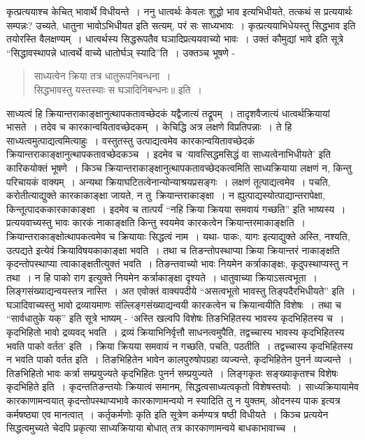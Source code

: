 {कृत्प्रत्ययाश्च केचित् भावार्थे विधीयन्ते~। ननु धात्वर्थः केवलः शुद्धो भाव इत्यभिधीयते, तत्कथं स प्रत्ययार्थः सम्पन्नः? उच्यते, धातुना भावोऽभिधीयत इति सत्यम्, परं सः साध्यभावः~। कृत्प्रत्ययाभिधेयस्तु सिद्धभाव इति तयोरस्ति वैलक्षण्यम्~। धात्वर्थस्य सिद्धरूपतैव घञादिप्रत्ययवाच्यो भावः~। उक्तं कौमुद्यां भावे इति सूत्रे “सिद्धावस्थापन्ने धात्वर्थे वाच्ये धातोर्घञ् स्यादि”ति~। उक्तञ्च भूषणे -
\begin{verse}
{साध्यत्वेन क्रिया तत्र धातुरूपनिबन्धना~। }\\
{सिद्धभावस्तु यस्तस्याः स घञादिनिबन्धनः॥} इति~। 
\end{verse}
साध्यत्वं हि क्रियान्तराकाङ्क्षानुत्थापकतावच्छेदकं यद्वैजात्यं तद्रूपम्~।     तादृशवैजात्यं धात्वर्थ\-क्रियायां भासते~। तदेव च कारकान्वयितावच्छेदकम्~। केचिद्धि अत्र लक्षणे विप्रतिपन्नाः~। ते हि साध्यत्वमुत्पाद्यत्वमित्याहुः~। वस्तुतस्तु उत्पाद्यत्वमेव कारकान्वयितावच्छेदकं क्रियान्त\-राकाङ्क्षानुत्थापकतावच्छेदकञ्च~। इदमेव च ‘यावत्सिद्धमसिद्धं वा साध्यत्वेनाभिधीयते’ इति कारिकयोक्तं भूषणे~। किञ्च क्रियान्तराकाङ्क्षानुत्थापकतावच्छेदकत्वमिति साध्यक्रियाया \-लक्षणं न, किन्तु परिचायकं वाक्यम्~। अन्यथा क्रियाघटितत्वेनान्योन्याश्रयप्रसङ्गः~। \break लक्षणं तूत्पाद्यत्वमेव~। पचति, करोतीत्याद्युक्ते कारकाकाङ्क्षा जायते, न तु\hbox{ क्रियान्तराकाङ्क्षा~।} न ह्युत्पाद्यस्योत्पाद्यान्तरापेक्षा, किन्तूत्पादककारकाकाङ्क्षा~। इदमेव च तात्पर्यं “नहि क्रिया क्रियया समवायं गच्छति” इति भाष्यस्य~। प्रत्ययवाच्यस्तु भावः कारकं नाकाङ्क्षति \hbox{किन्तु} \hbox{स्वयमेव} कारकत्वेन क्रियान्तरमाकाङ्क्षति~। क्रियान्तराकाङ्क्षोत्थापकत्वमेव च क्रियायाः \hbox{सिद्धत्वं} नाम~। यथा- पाकः, यागः इत्याद्युक्ते अस्ति, नश्यति, उत्पद्यते इत्येवं क्रियाविषय\-काकाङ्क्षा भवति~। तथा च तिङन्तोपस्थाप्या क्रिया क्रियान्तरं नाकाङ्क्षति कृदन्तोपस्थाप्या त्वाकाङ्क्षतीत्युक्तं भवति~। तिङन्तवाच्यो भावः नियमेन कर्त्राकाङ्क्षः, कृदुपस्थाप्यस्तु न तथा~। न हि पाको राग इत्युक्ते नियमेन कर्त्राकाङ्क्षा दृश्यते~। धातुवाच्या क्रियाऽसत्वभूता~। लिङ्ग\-संख्याद्यन्वयस्तत्र नास्ति~। अत एवोक्तं वाक्यपदीये “असत्वभूतो भावस्तु तिङ्पदैरभिधीयते” इति~। घञादिवाच्यस्तु भावो द्रव्यायमाणः संल्लिङ्गसंख्याद्यन्वयी कारकत्वेन च क्रियान्वयीति विशेषः~। तथा च “सार्वधातुके यक्” इति सूत्रे भाष्यम् - ‘अस्ति खल्वपि विशेषः तिङभिहितस्य भावस्य कृदभिहितस्य च~। कृदभिहितो भावो द्रव्यवद् भवति~। द्रव्यं क्रियाभिनिर्वृत्तौ साधनत्वमुपैति, तद्वच्चास्य भावस्य कृदभिहितस्य भवति पाको वर्तत’ इति~। क्रिया क्रियया समवायं न गच्छति, पचति, पठतीति~। तद्वच्चास्य कृदभिहितस्य न भवति पाको वर्तत इति~। तिङभिहितेन भावेन कालपुरुषोपग्रहा व्यज्यन्ते, कृदभिहितेन पुनर्न व्यज्यन्ते~। तिङभिहितो भावः कर्त्रा सम्प्रयुज्यते कृदभिहितः पुनर्न सम्प्रयुज्यते~। लिङ्गकृतः सङ्ख्याकृतश्च विशेषः कृदभिहिते इति~। कृदन्ततिङन्तयोः क्रियात्वं समानम्, सिद्धत्वसाध्यत्वकृतो विशेषस्तयोः~। साध्यक्रियायामेव कारकाणामन्वयात् कृदन्तोपस्थाप्यभावे कारकाणामन्वयो न स्यादिति तु न युक्तम्, ओदनस्य पाक इत्यत्र कर्मषष्ठ्या एव मानत्वात्~। कर्तृकर्मणोः कृति इति सूत्रेण \-कर्मण्यत्र षष्ठी विधीयते~। किञ्च प्रत्ययेन सिद्धत्वमुच्यते चेदपि प्रकृत्या साध्यक्रियाया \hbox{बोधात्} तत्र कारकाणामन्वये बाधकाभावाच्च~। 
}
